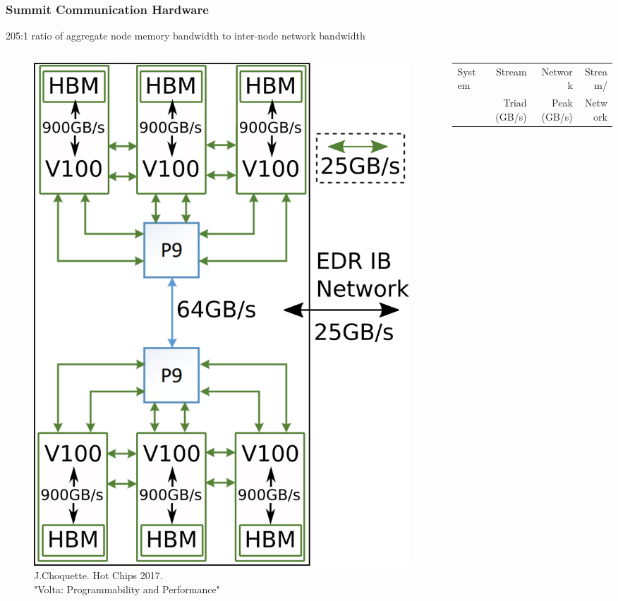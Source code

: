 \documentclass[aspectratio=169]{beamer}
\begin{document}
\begin{frame}
  \frametitle{Summit Communication Hardware}
  205:1 ratio of aggregate node memory bandwidth to inter-node network bandwidth
    \begin{columns}
      \begin{column}{0.3\textwidth}
        \begin{figure}
          \centering
          \includegraphics[width=.9\textwidth]{figures/summit-node.png}\\
          \tiny{J.Choquette. Hot Chips 2017. \\"Volta: Programmability and Performance"}
        \end{figure}
      \end{column}
    \begin{column}{0.7\textwidth}
      { \small
      \begin{table}[]
        \begin{tabular}{lrrr}
          System              & Stream       & Network     & Stream/ \\
                              & Triad (GB/s) & Peak (GB/s) & Network \\

\end{tabular}
\end{table}}
\end{column}
\end{columns}
\end{frame}
\end{document}
